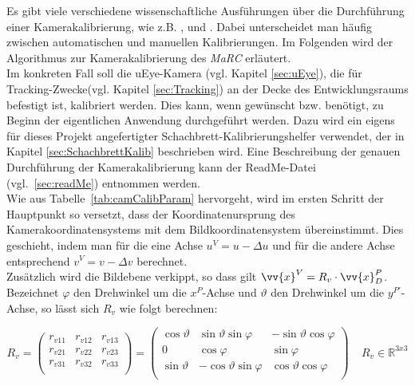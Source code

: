 Es gibt viele verschiedene wissenschaftliche Ausführungen über die Durchführung einer Kamerakalibrierung, wie z.B. \cite{5982395}, \cite{888718} und \cite{faugeras1993three}. Dabei unterscheidet man häufig zwischen automatischen und manuellen Kalibrierungen. Im Folgenden wird der Algorithmus zur Kamerakalibrierung des \textit{MaRC} erläutert.  \\
Im konkreten Fall soll die uEye-Kamera (vgl. Kapitel \ref{sec:uEye}), die für Tracking-Zwecke(vgl. Kapitel \ref{sec:Tracking}) an der Decke des Entwicklungsraums befestigt ist, kalibriert werden. Dies kann, wenn gewünscht bzw. benötigt, zu Beginn der eigentlichen Anwendung durchgeführt werden. Dazu wird ein eigens für dieses Projekt angefertigter Schachbrett-Kalibrierungshelfer verwendet, der in Kapitel \ref{sec:SchachbrettKalib} beschrieben wird. Eine Beschreibung der genauen Durchführung der Kamerakalibrierung kann der ReadMe-Datei (vgl.~\ref{sec:readMe}) entnommen werden.\\
Wie aus Tabelle~\ref{tab:camCalibParam} hervorgeht, wird im ersten Schritt der Hauptpunkt so versetzt, dass der Koordinatenursprung des Kamerakoordinatensystems mit dem Bildkoordinatensystem übereinstimmt. Dies geschieht, indem man für die eine Achse $u^V = u - \Delta u$ und für die andere Achse entsprechend $v^V = v - \Delta v$ berechnet.\\
Zusätzlich wird die Bildebene verkippt, so dass gilt $\vv{x}^V = R_v \cdot \vv{x}^P_D$. Bezeichnet $\varphi$ den Drehwinkel um die $x^P$-Achse und $\vartheta$ den Drehwinkel um die $y^{P'}$-Achse, so lässt sich $R_v$ wie folgt berechnen:

\begin{equation}
\label{equ:Rverkippt}
R_v = 
\begin{pmatrix}
r_{v11} & r_{v12} & r_{v13} \\
r_{v21} & r_{v22} & r_{v23} \\
r_{v31} & r_{v32} & r_{v33} \\
\end{pmatrix} = 
\begin{pmatrix}
\cos\vartheta & \sin\vartheta \sin\varphi & -\sin\vartheta \cos\varphi \\
0 & \cos\varphi & \sin\varphi\\
\sin\vartheta & -\cos\vartheta \sin\varphi & \cos\vartheta \cos\varphi \\
\end{pmatrix} 
~ ~ ~ ~ ~R_v \in \mathbb{R}^{3x3}
\end{equation}

